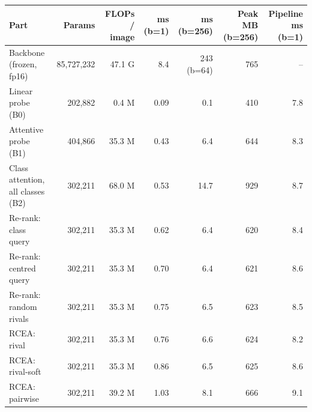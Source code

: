 \begin{tabular}{lrrrrrr}
\toprule
Part & Params & FLOPs / image & ms (b=1) & ms (b=256) & Peak MB (b=256) & Pipeline ms (b=1) \\
\midrule
Backbone (frozen, fp16) & 85,727,232 & 47.1 G & 8.4 & 243 (b=64) & 765 & -- \\
\midrule
Linear probe (B0) & 202,882 & 0.4 M & 0.09 & 0.1 & 410 & 7.8 \\
Attentive probe (B1) & 404,866 & 35.3 M & 0.43 & 6.4 & 644 & 8.3 \\
Class attention, all classes (B2) & 302,211 & 68.0 M & 0.53 & 14.7 & 929 & 8.7 \\
Re-rank: class query & 302,211 & 35.3 M & 0.62 & 6.4 & 620 & 8.4 \\
Re-rank: centred query & 302,211 & 35.3 M & 0.70 & 6.4 & 621 & 8.6 \\
Re-rank: random rivals & 302,211 & 35.3 M & 0.75 & 6.5 & 623 & 8.5 \\
RCEA: rival & 302,211 & 35.3 M & 0.76 & 6.6 & 624 & 8.2 \\
RCEA: rival-soft & 302,211 & 35.3 M & 0.86 & 6.5 & 625 & 8.6 \\
RCEA: pairwise & 302,211 & 39.2 M & 1.03 & 8.1 & 666 & 9.1 \\
\bottomrule
\end{tabular}
